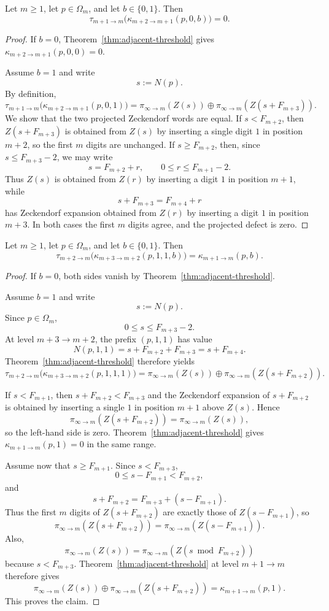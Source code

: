 \begin{lemma}
\label{lem:zero-barrier}
Let $m\ge 1$, let $p\in\Omega_m$, and let $b\in\{0,1\}$.  Then
\[
\tau_{m+1\to m}\bigl(\kappa_{m+2\to m+1}(p,0,b)\bigr)=0.
\]
\end{lemma}

\begin{proof}
If $b=0$, Theorem~\ref{thm:adjacent-threshold} gives
$\kappa_{m+2\to m+1}(p,0,0)=0$.

Assume $b=1$ and write
\[
s:=N(p).
\]
By definition,
\[
\tau_{m+1\to m}\bigl(\kappa_{m+2\to m+1}(p,0,1)\bigr)
=
\pi_{\infty\to m}(Z(s))
\oplus
\pi_{\infty\to m}(Z(s+F_{m+3})).
\]
We show that the two projected Zeckendorf words are equal.  If
$s<F_{m+2}$, then $Z(s+F_{m+3})$ is obtained from $Z(s)$ by inserting a
single digit $1$ in position $m+2$, so the first $m$ digits are unchanged.
If $s\ge F_{m+2}$, then, since $s\le F_{m+3}-2$, we may write
\[
s=F_{m+2}+r,
\qquad
0\le r\le F_{m+1}-2.
\]
Thus $Z(s)$ is obtained from $Z(r)$ by inserting a digit $1$ in position
$m+1$, while
\[
s+F_{m+3}=F_{m+4}+r
\]
has Zeckendorf expansion obtained from $Z(r)$ by inserting a digit $1$ in
position $m+3$.  In both cases the first $m$ digits agree, and the projected
defect is zero.
\end{proof}

\begin{lemma}
\label{lem:double-one-reduction}
Let $m\ge 1$, let $p\in\Omega_m$, and let $b\in\{0,1\}$.  Then
\[
\tau_{m+2\to m}\bigl(\kappa_{m+3\to m+2}(p,1,1,b)\bigr)
=
\kappa_{m+1\to m}(p,b).
\]
\end{lemma}

\begin{proof}
If $b=0$, both sides vanish by Theorem~\ref{thm:adjacent-threshold}.

Assume $b=1$ and write
\[
s:=N(p).
\]
Since $p\in\Omega_m$,
\[
0\le s\le F_{m+3}-2.
\]
At level $m+3\to m+2$, the prefix $(p,1,1)$ has value
\[
N(p,1,1)=s+F_{m+2}+F_{m+3}=s+F_{m+4}.
\]
Theorem~\ref{thm:adjacent-threshold} therefore yields
\[
\tau_{m+2\to m}\bigl(\kappa_{m+3\to m+2}(p,1,1,1)\bigr)
=
\pi_{\infty\to m}(Z(s))
\oplus
\pi_{\infty\to m}(Z(s+F_{m+2})).
\]

If $s<F_{m+1}$, then $s+F_{m+2}<F_{m+3}$ and the Zeckendorf expansion of
$s+F_{m+2}$ is obtained by inserting a single $1$ in position $m+1$ above
$Z(s)$.  Hence
\[
\pi_{\infty\to m}(Z(s+F_{m+2}))=\pi_{\infty\to m}(Z(s)),
\]
so the left-hand side is zero.  Theorem~\ref{thm:adjacent-threshold} gives
$\kappa_{m+1\to m}(p,1)=0$ in the same range.

Assume now that $s\ge F_{m+1}$.  Since $s<F_{m+3}$,
\[
0\le s-F_{m+1}<F_{m+2},
\]
and
\[
s+F_{m+2}=F_{m+3}+(s-F_{m+1}).
\]
Thus the first $m$ digits of $Z(s+F_{m+2})$ are exactly those of
$Z(s-F_{m+1})$, so
\[
\pi_{\infty\to m}(Z(s+F_{m+2}))
=
\pi_{\infty\to m}(Z(s-F_{m+1})).
\]
Also,
\[
\pi_{\infty\to m}(Z(s))
=
\pi_{\infty\to m}(Z(s\bmod F_{m+2}))
\]
because $s<F_{m+3}$.  Theorem~\ref{thm:adjacent-threshold} at level
$m+1\to m$ therefore gives
\[
\pi_{\infty\to m}(Z(s))
\oplus
\pi_{\infty\to m}(Z(s+F_{m+2}))
=
\kappa_{m+1\to m}(p,1).
\]
This proves the claim.
\end{proof}

